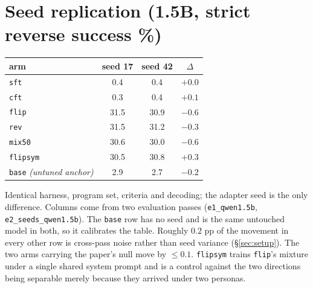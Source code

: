 \documentclass{article}
\newcommand{\arm}[1]{\texttt{#1}}
\begin{document}
\section{Seed replication (1.5B, strict reverse success \%)}
\label{app:seeds}
\begin{center}\small
\begin{tabular}{lccc}
\toprule
arm & seed 17 & seed 42 & $\Delta$ \\
\midrule
\arm{sft}     & 0.4 & 0.4 & $+0.0$ \\
\arm{cft}     & 0.3 & 0.4 & $+0.1$ \\
\midrule
\arm{flip}    & 31.5 & 30.9 & $-0.6$ \\
\arm{rev}     & 31.5 & 31.2 & $-0.3$ \\
\arm{mix50}   & 30.6 & 30.0 & $-0.6$ \\
\arm{flipsym} & 30.5 & 30.8 & $+0.3$ \\
\midrule
\arm{base} \emph{(untuned anchor)} & 2.9 & 2.7 & $-0.2$ \\
\bottomrule
\end{tabular}
\end{center}
Identical harness, program set, criteria and decoding; the adapter seed is the only
difference. Columns come from two evaluation passes
(\texttt{e1\_qwen1.5b}, \texttt{e2\_seeds\_qwen1.5b}). The \arm{base} row has no seed and
is the same untouched model in both, so it calibrates the table. Roughly $0.2$ pp of the
movement in every other row is cross-pass noise rather than seed variance
(§\ref{sec:setup}).
The two arms carrying the paper's null move by $\leq0.1$. \arm{flipsym} trains \arm{flip}'s
mixture under a single shared system prompt and is a control against the two directions
being separable merely because they arrived under two personas.
\end{document}
